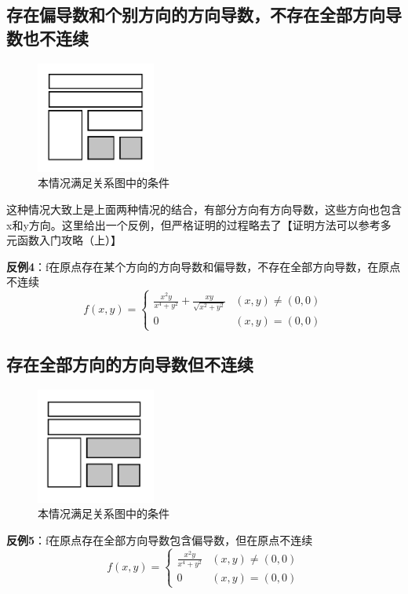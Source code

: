 \documentclass{article}
\begin{document}
\subsection{存在偏导数和个别方向的方向导数，不存在全部方向导数也不连续}
\begin{figure}[!h]
    \centering
    \includegraphics[width=0.35\textwidth]{pic/05.png}
    \caption{本情况满足关系图中的条件}
\end{figure}

这种情况大致上是上面两种情况的结合，有部分方向有方向导数，这些方向也包含x和y方向。这里给出一个反例，但严格证明的过程略去了【证明方法可以参考多元函数入门攻略（上）】

\textbf{反例4}：f在原点存在某个方向的方向导数和偏导数，不存在全部方向导数，在原点不连续
\[f(x,y)= \begin{cases} \frac{x^2y}{x^4+y^2}+\frac{xy}{\sqrt{x^2+y^2}}   & (x,y) \neq (0,0)\\ 0 & (x,y) = (0,0)\end{cases}\]


\subsection{存在全部方向的方向导数但不连续}
\begin{figure}[!h]
    \centering
    \includegraphics[width=0.35\textwidth]{pic/06.png}
    \caption{本情况满足关系图中的条件}
\end{figure}

\textbf{反例5}：f在原点存在全部方向导数包含偏导数，但在原点不连续
\[f(x,y)= \begin{cases} \frac{x^2y}{x^4+y^2}   & (x,y) \neq (0,0)\\ 0 & (x,y) = (0,0)\end{cases}\]
\end{document}
